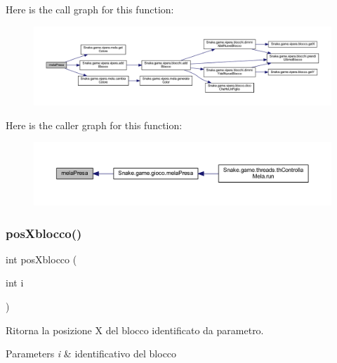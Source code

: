 Here is the call graph for this function\+:
\nopagebreak
\begin{figure}[H]
\begin{center}
\leavevmode
\includegraphics[width=350pt]{class_snake_1_1game_1_1utility_1_1game_manager_a3f6240b54a13e397255c9b3f7354cf45_cgraph}
\end{center}
\end{figure}
Here is the caller graph for this function\+:
\nopagebreak
\begin{figure}[H]
\begin{center}
\leavevmode
\includegraphics[width=350pt]{class_snake_1_1game_1_1utility_1_1game_manager_a3f6240b54a13e397255c9b3f7354cf45_icgraph}
\end{center}
\end{figure}
\mbox{\label{class_snake_1_1game_1_1utility_1_1game_manager_a88318c562485640585510cbd35e76b07}} 
\subsubsection{\texorpdfstring{pos\+Xblocco()}{posXblocco()}}
{\footnotesize\ttfamily int pos\+Xblocco (\begin{DoxyParamCaption}\item[{int}]{i }\end{DoxyParamCaption})}



Ritorna la posizione X del blocco identificato da parametro. 


\begin{DoxyParams}{Parameters}
{\em i} & identificativo del blocco \\
\hline
\end{DoxyParams}


